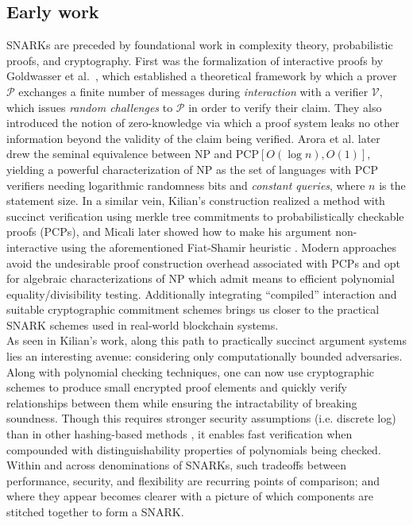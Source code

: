 \subsection{Early work}
\noindent SNARKs are preceded by foundational work in complexity theory, probabilistic proofs, and cryptography. First was the formalization of interactive proofs by Goldwasser et al.\ \cite{ipfirst}, which established a theoretical framework by which a prover $\mathcal{P}$ exchanges a finite number of messages during \textit{interaction} with a verifier $\mathcal{V}$, which issues \textit{random challenges} to $\mathcal{P}$ in order to verify their claim. They also introduced the notion of zero-knowledge via which a proof system leaks no other information beyond the validity of the claim being verified. Arora et al. \cite{pcpthm1, pcpthm2} later drew the seminal equivalence between NP and PCP$[O(\log n), O(1)]$, yielding a powerful characterization of NP as the set of languages with PCP verifiers needing logarithmic randomness bits and \textit{constant queries}, where $n$ is the statement size. In a similar vein, Kilian's construction \cite{kilian} realized a method with succinct verification using merkle tree commitments to probabilistically checkable proofs (PCPs), and Micali later showed how to make his argument non-interactive \cite{micalisnark} using the aforementioned Fiat-Shamir heuristic \cite{fiatshamir}. Modern approaches avoid the undesirable proof construction overhead associated with PCPs and opt for algebraic characterizations of NP which admit means to efficient polynomial equality/divisibility testing. Additionally integrating ``compiled'' interaction and suitable cryptographic commitment schemes brings us closer to the practical SNARK schemes used in real-world blockchain systems.\\

\noindent As seen in Kilian's work, along this path to practically succinct argument systems lies an interesting avenue: considering only computationally bounded adversaries. Along with polynomial checking techniques, one can now use cryptographic schemes to produce small encrypted proof elements and quickly verify relationships between them while ensuring the intractability of breaking soundness. Though this requires stronger security assumptions (i.e. discrete log) than in other hashing-based methods \cite{starks, ligero, hyrax, aurora}, it enables fast verification when compounded with distinguishability properties of polynomials being checked. Within and across denominations of SNARKs, such tradeoffs between performance, security, and flexibility are recurring points of comparison; and where they appear becomes clearer with a picture of which components are stitched together to form a SNARK.


